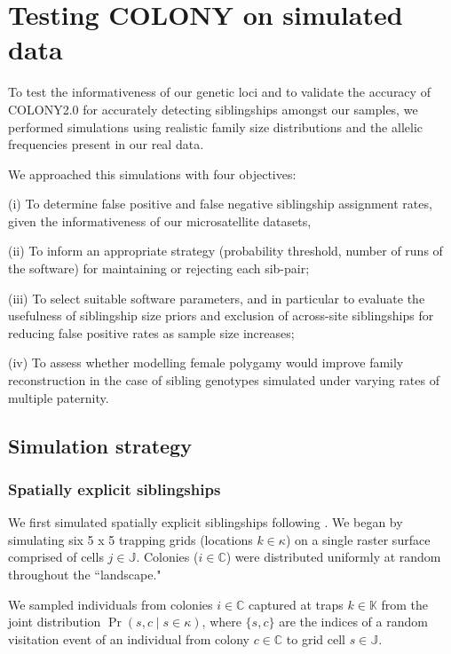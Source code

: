 \documentclass[12pt]{article}
\begin{document}
\section{Testing COLONY on simulated data}
To test the informativeness of our genetic loci and to validate the accuracy of COLONY2.0 \parencite{jonesCOLONYProgramParentage2010} for accurately detecting siblingships amongst our samples, we performed simulations using realistic family size distributions and the allelic frequencies present in our real data.

We approached this simulations with four objectives:

(i) To determine false positive and false negative siblingship assignment rates, given the informativeness of our microsatellite datasets, 

(ii) To inform an appropriate strategy (probability threshold, number of runs of the software) for maintaining or rejecting each sib-pair;

(iii) To select suitable software parameters, and in particular to evaluate the usefulness of siblingship size priors and exclusion of across-site siblingships for reducing false positive rates as sample size increases;

(iv) To assess whether modelling female polygamy would improve family reconstruction in the case of sibling genotypes simulated under varying rates of multiple paternity.

\subsection{Simulation strategy}

\subsubsection{Spatially explicit siblingships}
We first simulated spatially explicit siblingships following \textcite{popeInferringForagingRanges2017}. We began by simulating six 5 x 5 trapping grids (locations $k \in \kappa$) on a single raster surface comprised of cells $j \in \mathbb{J}$. Colonies ($i \in \mathbb{C}$) were distributed uniformly at random throughout the ``landscape."

We sampled individuals from colonies $i \in \mathbb{C}$ captured at traps $k \in \mathbb{K}$ from the joint distribution $\Pr(s, c \mid s \in \kappa)$, where $\{s,c\}$ are the indices of a random visitation event of an individual from colony $c \in \mathbb{C}$ to grid cell $s \in \mathbb{J}$.
\end{document}
